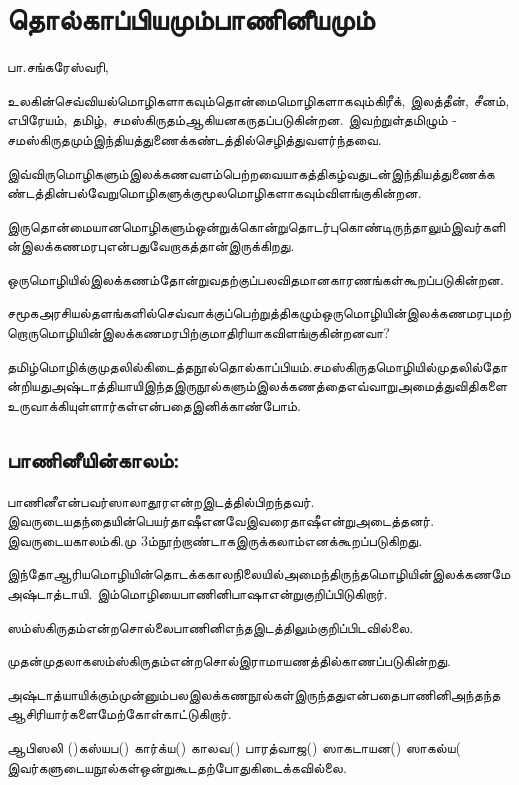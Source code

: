 \section*{தொல்காப்பியமும்பாணினீயமும்}

\begin{flushright}
பா.சங்கரேஸ்வரி,
\end{flushright}

உலகின்செவ்வியல்மொழிகளாகவும்தொன்மைமொழிகளாகவும்கிரீக், இலத்தீன், சீனம், எபிரேயம், தமிழ், சமஸ்கிருதம்ஆகியனகருதப்படுகின்றன. இவற்றுள்தமிழும் - சமஸ்கிருதமும்இந்தியத்துணைக்கண்டத்தில்செழித்துவளர்ந்தவை.

இவ்விருமொழிகளும்இலக்கணவளம்பெற்றவையாகத்திகழ்வதுடன்இந்தியத்துணைக்கண்டத்தின்பல்வேறுமொழிகளுக்குமூலமொழிகளாகவும்விளங்குகின்றன. 

இருதொன்மையானமொழிகளும்ஒன்றுக்கொன்றுதொடர்புகொண்டிருந்தாலும்இவர்களின்இலக்கணமரபுஎன்பதுவேறாகத்தான்இருக்கிறது. 

ஒருமொழியில்இலக்கணம்தோன்றுவதற்குப்பலவிதமானகாரணங்கள்கூறப்படுகின்றன. 

சமூகஅரசியல்தளங்களில்செவ்வாக்குப்பெற்றுத்திகழும்ஒருமொழியின்இலக்கணமரபுமற்றொருமொழியின்இலக்கணமரபிற்குமாதிரியாகவிளங்குகின்றனவா? 

தமிழ்மொழிக்குமுதலில்கிடைத்தநூல்தொல்காப்பியம்.சமஸ்கிருதமொழியில்முதலில்தோன்றியதுஅஷ்டாத்தியாயிஇந்தஇருநூல்களும்இலக்கணத்தைஎவ்வாறுஅமைத்துவிதிகளைஉருவாக்கியுள்ளார்கள்என்பதைஇனிக்காண்போம்.

\subsection{பாணினீயின்காலம்:}

பாணினீஎன்பவர்ஸாலாதூரஎன்றஇடத்தில்பிறந்தவர். இவருடையதந்தையின்பெயர்தாஷீஎனவேஇவரைதாஷீஎன்றுஅடைத்தனர். இவருடையகாலம்கி.மு 3ம்நூற்றாண்டாகஇருக்கலாம்எனக்கூறப்படுகிறது.

 இந்தோஆரியமொழியின்தொடக்ககாலநிலையில்அமைந்திருந்தமொழியின்இலக்கணமேஅஷ்டாத்டாயி. இம்மொழியைபாணினிபாஷாஎன்றுகுறிப்பிடுகிறார். 

ஸம்ஸ்கிருதம்என்றசொல்லைபாணினிஎந்தஇடத்திலும்குறிப்பிடவில்லை. 

முதன்முதலாகஸம்ஸ்கிருதம்என்றசொல்இராமாயணத்தில்காணப்படுகின்றது. 

அஷ்டாத்யாயிக்கும்முன்னும்பலஇலக்கணநூல்கள்இருந்ததுஎன்பதைபாணினிஅந்தந்தஆசிரியார்களைமேற்கோள்காட்டுகிறார். 

ஆபிஸலி ()கஸ்யப() கார்க்ய() காலவ() பாரத்வாஜ() ஸாகடாயன() ஸாகல்ய( இவர்களுடையநூல்கள்ஒன்றுகூடதற்போதுகிடைக்கவில்லை.


